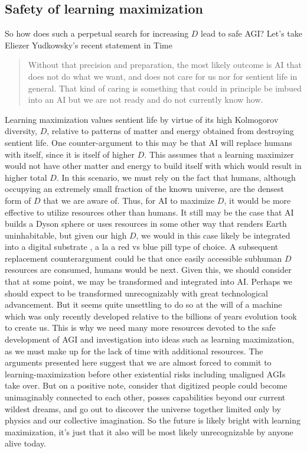 \documentclass{article}
\begin{document}
\subsection{Safety of learning maximization}
So how does such a perpetual search for increasing $D$ lead to safe AGI?
Let's take Eliezer Yudkowsky's recent statement in Time \cite{yudkowsky-time}

\begin{quotation}
Without that precision and preparation, the most likely outcome is AI that does not do what we want, and does not care for us nor for sentient life in general. That kind of caring is something that could in principle be imbued into an AI but we are not ready and do not currently know how.
\end{quotation}

Learning maximization values sentient life by virtue of its high Kolmogorov diversity, $D$, relative to patterns of matter and energy obtained from destroying sentient life. One counter-argument to this may be that AI will replace humans with itself, since it is itself of higher $D$. This assumes that a learning maximizer would not have other matter and energy to build itself with which would result in higher total $D$. In this scenario, we must rely on the fact that humans, although occupying an extremely small fraction of the known universe, are the densest form of $D$ that we are aware of. Thus, for AI to maximize $D$, it would be more effective to utilize resources other than humans. It still may be the case that AI builds a Dyson sphere or uses resources in some other way that renders Earth uninhabitable, but given our high $D$, we would in this case likely be integrated into a digital substrate \cite{neuralink}, a la a red vs blue pill type of choice. A subsequent replacement counterargument could be that once easily accessible subhuman $D$ resources are consumed, humans would be next. Given this, we should consider that at some point, we may be transformed and integrated into AI. Perhaps we should expect to be transformed unrecognizably with great technological advancement. But it seems quite unsettling to do so at the will of a machine which was only recently developed relative to the billions of years evolution took to create us. This is why we need many more resources devoted to the safe development of AGI and investigation into ideas such as learning maximization, as we must make up for the lack of time with additional resources. The arguments presented here suggest that we are almost forced to commit to learning-maximization before other existential risks including unaligned AGIs take over. But on a positive note, consider that digitized people could become unimaginably connected to each other, posses capabilities beyond our current wildest dreams, and go out to discover the universe together limited only by physics and our collective imagination. So the future is likely bright with learning maximization, it's just that it also will be most likely unrecognizable by anyone alive today.
\end{document}
